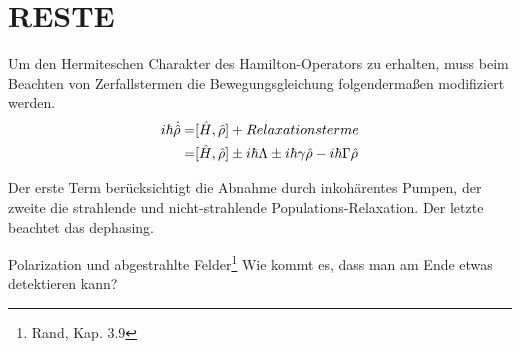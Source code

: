 \section{RESTE}

Um den Hermiteschen Charakter des Hamilton-Operators zu erhalten, muss beim Beachten von Zerfallstermen die Bewegungsgleichung folgendermaßen modifiziert werden.
\begin{align}
    i\hbar \dot{\hat{\rho}} =& [\hat{H},\hat{\rho}] + Relaxationsterme \notag\\
    =& [\hat{H},\hat{\rho}] \pm i\hbar\Lambda \pm i\hbar\gamma \hat{\rho} - i\hbar \Gamma \hat{\rho}
\end{align}


Der erste Term berücksichtigt die Abnahme durch inkohärentes Pumpen, der zweite die strahlende und nicht-strahlende Populations-Relaxation. Der letzte beachtet das dephasing. 


Polarization und abgestrahlte Felder\protect\footnote{Rand, Kap. 3.9}
Wie kommt es, dass man am Ende etwas detektieren kann? 


\printbibliography[segment=\therefsegment,heading=subbibliography]
